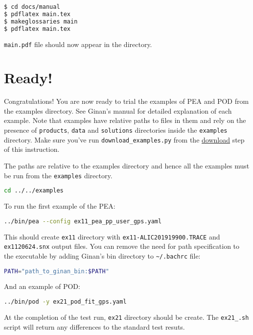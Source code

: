 \begin{lstlisting}[language=bash]
$ cd docs/manual
$ pdflatex main.tex
$ makeglossaries main
$ pdflatex main.tex
\end{lstlisting}

\texttt{main.pdf} file should now appear in the directory.\\


\section{Ready!}\label{ready}

Congratulations! You are now ready to trial the examples of PEA and POD
from the examples directory. See Ginan's manual for detailed explanation
of each example. Note that examples have relative paths to files in them
and rely on the presence of \texttt{products}, \texttt{data} and
\texttt{solutions} directories inside the \texttt{examples} directory.
Make sure you've run \texttt{download\_examples.py} from the
\hyperref[download]{download} step of this instruction.

The paths are relative to the examples directory and hence all the
examples must be run from the \texttt{examples} directory.

\begin{lstlisting}[language=bash]
cd ../../examples
\end{lstlisting}

To run the first example of the PEA:

\begin{lstlisting}[language=bash]
../bin/pea --config ex11_pea_pp_user_gps.yaml
\end{lstlisting}

This should create \texttt{ex11} directory with
\texttt{ex11-ALIC201919900.TRACE} and \texttt{ex1120624.snx} output
files. You can remove the need for path specification to the executable
by adding Ginan's bin directory to \texttt{\textasciitilde{}/.bachrc}
file:

\begin{lstlisting}[language=bash]
PATH="path_to_ginan_bin:$PATH"
\end{lstlisting}

And an example of POD:

\begin{lstlisting}[language=bash]
../bin/pod -y ex21_pod_fit_gps.yaml
\end{lstlisting}

At the completion of the test run, \texttt{ex21} directory should be
create. The \texttt{ex21\_.sh} script will return any differences to the
standard test resuts.


